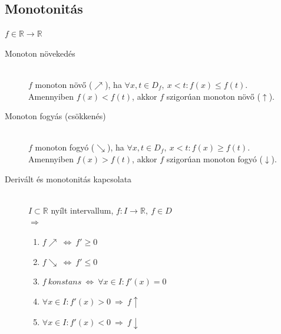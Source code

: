 \documentclass[margin=0px]{article}
\newcommand{\R}{\mathbb{R}}
\begin{document}
\subsection{Monotonitás}
$ f\in \R \rightarrow \R $
\begin{description}
    \item[Monoton növekedés] \hfill \\
        $ f $ monoton növő ($\nearrow$), ha $\forall x,t \in D_f, \ x < t : f(x) \leq f(t) $. \\
        Amennyiben $  f(x) < f(t) $, akkor $f$ szigorúan monoton növő ($\uparrow$).
    \item[Monoton fogyás (csökkenés)] \hfill \\
        $ f $ monoton fogyó ($\searrow$), ha $\forall x,t \in D_f, \ x < t : f(x) \geq f(t) $. \\
        Amennyiben $  f(x) > f(t) $, akkor $f$ szigorúan monoton fogyó ($\downarrow$).
    \item[Derivált és monotonitás kapcsolata] \hfill \\
        $ I \subset \R $ nyílt intervallum, $ f:I\rightarrow \R, \ f \in D$\\
        $\Rightarrow$
        \begin{enumerate}
            \item $ f \nearrow \ \Leftrightarrow \ f' \geq 0$
            \item $ f \searrow \ \Leftrightarrow \ f' \leq 0$
            \item $ f \ konstans \ \Leftrightarrow \ \forall x \in I : f'(x) = 0$
            \item $ \forall x \in I : f'(x) > 0 \ \Rightarrow  \ f \uparrow $
            \item $ \forall x \in I : f'(x) < 0 \ \Rightarrow  \ f \downarrow $
        \end{enumerate}
\end{description}
\end{document}
